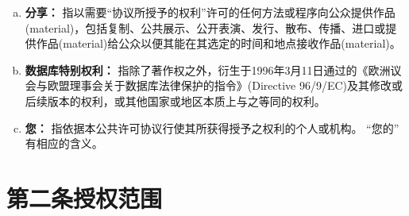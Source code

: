 \begin{enumerate}[a.]
    \item \textbf{分享：} 指以需要“协议所授予的权利”许可的任何方法或程序向公众提供作品(material)，包括复制、公共展示、公开表演、发行、散布、传播、进口或提供作品(material)给公众以便其能在其选定的时间和地点接收作品(material)。\label{entry:A.1.l}
    \item \textbf{数据库特别权利：} 指除了著作权之外，衍生于1996年3月11日通过的《欧洲议会与欧盟理事会关于数据库法律保护的指令》(Directive 96/9/EC)及其修改或后续版本的权利，或其他国家或地区本质上与之等同的权利。\label{entry:A.1.m}
    \item \textbf{您：} 指依据本公共许可协议行使其所获得授予之权利的个人或机构。 “您的” 有相应的含义。\label{entry:A.1.n}
\end{enumerate}

\section*{第二条\;授权范围} \label{section:A.2}

